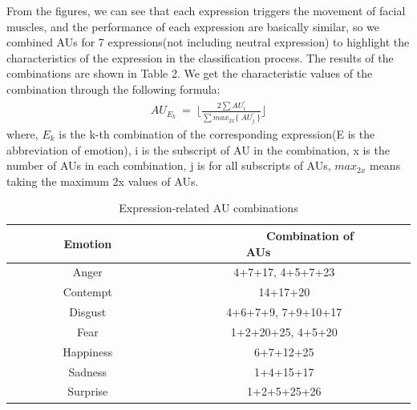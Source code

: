 \documentclass[10pt, conference, compsocconf]{IEEEtran}
\begin{document}
From the figures, we can see that each expression triggers the movement of facial muscles, and the performance of each expression are basically similar, so we combined AUs for 7 expressions(not including neutral expression) to highlight the characteristics of the expression in the classification process. The results of the combinations are shown in Table 2. We get the characteristic values of the combination through the following formula:
\begin{equation}\label{eqn:1}
\begin{split}
\displaystyle AU_{E_k}\ =\ \lfloor\frac{2\sum AU_i^{'}}{\sum max_{2x}\{\ AU_j^{'}\ \} }\rfloor
\end{split}
\end{equation}
where, $E_k$ is  the k-th combination of the corresponding expression(E is the abbreviation of emotion), i is the subscript of AU in the combination, x is the number of AUs in each combination, j is for all subscripts of AUs, $max_{2x}$ means taking the maximum 2x values of AUs.

\begin{table}
	\caption{Expression-related AU combinations}
	\label{tab:freq}
	\begin{tabular}{ccl}
		\toprule
		\ \ \ \ \ \ \ \ Emotion\ \ \ \ \ \ \ \ & \ \ \ \ \ \ \ \ Combination of AUs\ \ \ \ \ \ \ \ \\
		\midrule
		Anger & 4+7+17, 4+5+7+23\\
		Contempt &14+17+20\\
		Disgust & 4+6+7+9, 7+9+10+17\\
		Fear & 1+2+20+25, 4+5+20\\
		Happiness & 6+7+12+25\\
		Sadness &1+4+15+17\\
		Surprise & 1+2+5+25+26\\
		\bottomrule
	\end{tabular}
\end{table}
\end{document}
